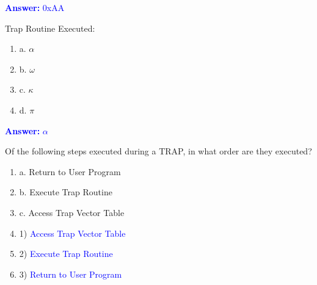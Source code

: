 \documentclass{article}
\begin{document}
\begin{enumerate}[label=(\alph*)]
\textcolor{blue}{\textbf{Answer: } 0xAA}

Trap Routine Executed:

\begin{enumerate}[label={}]
    \item a. $\alpha$ 
    \item b. $\omega$
    \item c. $\kappa$
    \item d. $\pi$
\end{enumerate}

\textcolor{blue}{\textbf{Answer: } $\alpha$}

Of the following steps executed during a TRAP, in what order are they executed?
\begin{enumerate}[label={}]
    
\item a. Return to User Program
\item b. Execute Trap Routine
\item c. Access Trap Vector Table
\newline
\item 1) \textcolor{blue}{Access Trap Vector Table}
\item 2) \textcolor{blue}{Execute Trap Routine}
\item 3) \textcolor{blue}{Return to User Program}

\end{enumerate}
\end{enumerate}
\end{document}
